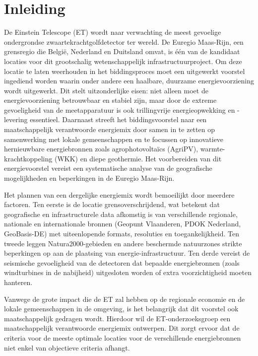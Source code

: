 \section{Inleiding}%
\label{sec:inleiding}

De Einstein Telescope (ET) wordt naar verwachting de meest gevoelige ondergrondse zwaartekrachtgolfdetector ter wereld. De Euregio Maas-\-Rijn, een grensregio die België, Nederland en Duitsland omvat, is één van de kandidaat locaties voor dit grootschalig wetenschappelijk infrastructuurproject. Om deze locatie te laten weerhouden in het biddingsproces moet een uitgewerkt voorstel ingediend worden waarin onder andere een haalbare, duurzame energievoorziening wordt uitgewerkt. Dit stelt uitzonderlijke eisen: niet alleen moet de energievoorziening betrouwbaar en stabiel zijn, maar door de extreme gevoeligheid van de meetapparatuur is ook trillingvrije energieopwekking en -levering essentieel. Daarnaast streeft het biddingsvoorstel naar een maatschappelijk verantwoorde energiemix door samen in te zetten op samenwerking met lokale gemeenschappen en te focussen op innovatieve hernieuwbare energiebronnen zoals agrophotovoltaïcs (AgriPV), warmte-\-krachtkoppeling (WKK) en diepe geothermie. Het voorbereiden van dit energievoorstel vereist een systematische analyse van de geografische mogelijkheden en beperkingen in de Euregio Maas-\-Rijn.

Het plannen van een dergelijke energiemix wordt bemoeilijkt door meerdere factoren. Ten eerste is de locatie grensoverschrijdend, wat betekent dat geografische en infrastructurele data afkomstig is van verschillende regionale, nationale en internationale bronnen (Geopunt Vlaanderen, PDOK Nederland, GeoBasis-\-DE) met uiteenlopende formats, resoluties en toegankelijkheid. Ten tweede leggen Natura2000-\-gebieden en andere beschermde natuurzones strikte beperkingen op aan de plaatsing van energie-\-infrastructuur. Ten derde vereist de seismische gevoeligheid van de detectoren dat bepaalde energiebronnen (zoals windturbines in de nabijheid) uitgesloten worden of extra voorzichtigheid moeten hanteren.

Vanwege de grote impact die de ET zal hebben op de regionale economie en de lokale gemeenschappen in de omgeving, is het belangrijk dat dit voorstel ook maatschappelijk gedragen wordt. Hierdoor wil de ET-\-onderzoeksgroep een maatschappelijk verantwoorde energiemix ontwerpen. Dit zorgt ervoor dat de criteria voor de meeste optimale locaties voor de verschillende energiebronnen niet enkel van objectieve criteria afhangt.

